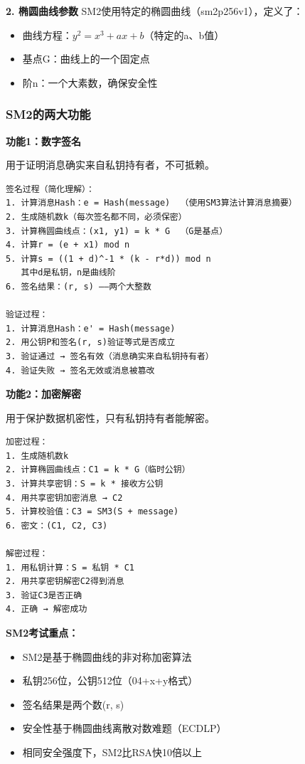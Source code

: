 ﻿\documentclass[12pt,a4paper]{article}
\begin{document}
\textbf{2. 椭圆曲线参数}
SM2使用特定的椭圆曲线（sm2p256v1），定义了：
\begin{itemize}[leftmargin=1.5em]
\item 曲线方程：$y^2 = x^3 + ax + b$（特定的a、b值）
\item 基点G：曲线上的一个固定点
\item 阶n：一个大素数，确保安全性
\end{itemize}

\subsubsection{SM2的两大功能}

\textbf{功能1：数字签名}

用于证明消息确实来自私钥持有者，不可抵赖。

\begin{lstlisting}
签名过程（简化理解）：
1. 计算消息Hash：e = Hash(message)  （使用SM3算法计算消息摘要）
2. 生成随机数k（每次签名都不同，必须保密）
3. 计算椭圆曲线点：(x1, y1) = k * G  （G是基点）
4. 计算r = (e + x1) mod n
5. 计算s = ((1 + d)^-1 * (k - r*d)) mod n
   其中d是私钥，n是曲线阶
6. 签名结果：(r, s) ——两个大整数

验证过程：
1. 计算消息Hash：e' = Hash(message)
2. 用公钥P和签名(r, s)验证等式是否成立
3. 验证通过 → 签名有效（消息确实来自私钥持有者）
4. 验证失败 → 签名无效或消息被篡改
\end{lstlisting}

\textbf{功能2：加密解密}

用于保护数据机密性，只有私钥持有者能解密。

\begin{lstlisting}
加密过程：
1. 生成随机数k
2. 计算椭圆曲线点：C1 = k * G（临时公钥）
3. 计算共享密钥：S = k * 接收方公钥
4. 用共享密钥加密消息 → C2
5. 计算校验值：C3 = SM3(S + message)
6. 密文：(C1, C2, C3)

解密过程：
1. 用私钥计算：S = 私钥 * C1
2. 用共享密钥解密C2得到消息
3. 验证C3是否正确
4. 正确 → 解密成功
\end{lstlisting}

\begin{keypointbox}
\textbf{SM2考试重点：}
\begin{itemize}
\item SM2是基于椭圆曲线的非对称加密算法
\item 私钥256位，公钥512位（04+x+y格式）
\item 签名结果是两个数(r, s)
\item 安全性基于椭圆曲线离散对数难题（ECDLP）
\item 相同安全强度下，SM2比RSA快10倍以上
\end{itemize}
\end{keypointbox}
\end{document}
